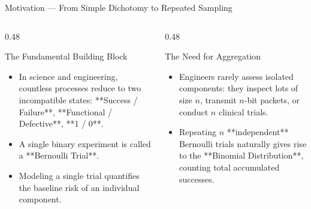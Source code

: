 \documentclass[aspectratio=169,xcolor={dvipsnames,table}]{beamer}
\begin{document}
\begin{frame}{Motivation --- From Simple Dichotomy to Repeated Sampling}
	\begin{columns}[T]
		\begin{column}{0.48\textwidth}
			\begin{block}{The Fundamental Building Block}
				\small
				\begin{itemize}
					\itemsep=0.08cm
					\item In science and engineering, countless processes reduce to two incompatible states: **Success / Failure**, **Functional / Defective**, **1 / 0**.
					\item A single binary experiment is called a **Bernoulli Trial**.
					\item Modeling a single trial quantifies the baseline risk of an individual component.
				\end{itemize}
			\end{block}
		\end{column}
		\begin{column}{0.48\textwidth}
			\begin{alertblock}{The Need for Aggregation}
				\small
				\begin{itemize}
					\itemsep=0.08cm
					\item Engineers rarely assess isolated components: they inspect lots of size $n$, transmit $n$-bit packets, or conduct $n$ clinical trials.
					\item Repeating $n$ **independent** Bernoulli trials naturally gives rise to the **Binomial Distribution**, counting total accumulated successes.
				\end{itemize}
			\end{alertblock}
		\end{column}
	\end{columns}
\end{frame}
\end{document}
